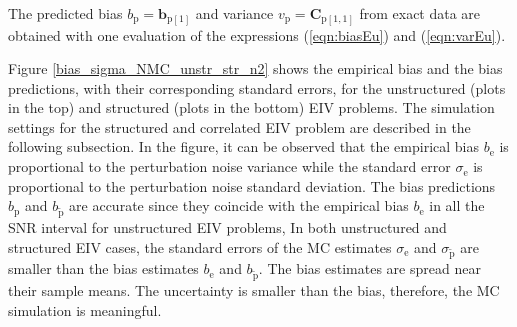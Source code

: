 The predicted bias $b_{\mathrm{p}} = \mathbf{b}_{\mathrm{p} \left[1\right]}$ and variance $v_{\mathrm{p}} = \mathbf{C}_{\mathrm{p} \left[1,1\right]}$ from exact data are obtained with one evaluation of the expressions (\ref{eqn:biasEu}) and (\ref{eqn:varEu}). %

Figure \ref{bias_sigma_NMC_unstr_str_n2} shows the empirical bias and the bias predictions, with their corresponding standard errors, for the unstructured (plots in the top) and structured (plots in the bottom) EIV problems.
The simulation settings for the structured and correlated EIV problem are described in the following subsection.
In the figure, it can be observed that the empirical bias $b_\mathrm{e}$ is proportional to the perturbation noise variance while the standard error $\sigma_\mathrm{e}$ is proportional to the perturbation noise standard deviation.
The bias predictions $b_\mathrm{p}$ and $b_{\widetilde{\mathrm{p}}}$ are accurate since they coincide with the empirical bias $b_\mathrm{e}$ in all the SNR interval for unstructured EIV problems, 
In both unstructured and structured EIV cases, the standard errors of the MC estimates $\sigma_{\mathrm{e}}$ and $\sigma_{\widetilde{\mathrm{p}}}$ are smaller than the bias estimates $b_{\mathrm{e}}$ and $b_{\widetilde{\mathrm{p}}}$.
The bias estimates are spread near their sample means. 
The uncertainty is smaller than the bias, therefore, the MC simulation is meaningful.

